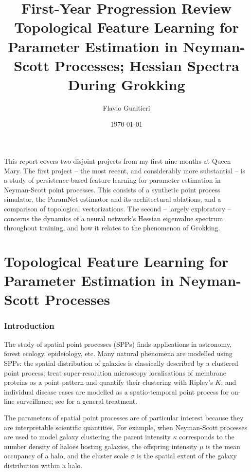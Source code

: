 \documentclass[11pt,a4paper]{article}
\title{First-Year Progression Review\\[4pt]
       \large Topological Feature Learning for Parameter Estimation in
       Neyman-Scott Processes; Hessian Spectra During Grokking}
\author{Flavio Gualtieri}
\date{\today}
\begin{document}
\maketitle

\noindent
This report covers two disjoint projects from my first nine months at Queen Mary. The first project -- the most recent, and considerably more substantial -- is a study of persistence-based feature learning for parameter estimation in Neyman-Scott point processes. This consists of a synthetic point process simulator, the ParamNet estimator and its
architectural ablations, and a comparison of topological vectorizations. The second -- largely exploratory -- concerns the dynamics of a neural network's Hessian eigenvalue spectrum throughout training, and how it relates to the phenomenon of Grokking.

\part{Topological Feature Learning for Parameter Estimation in Neyman-Scott
Processes}

\section{Introduction}
\label{sec:intro}

The study of spatial point processes (SPPs) finds applications in astronomy, forest ecology, epideiology, etc. Many natural phenomena are modelled using SPPs: the spatial distribution of galaxies is classically described by a clustered point process;
\citet{owen2010palm} treat super-resolution microscopy localisations of membrane proteins as a point pattern and quantify their clustering with Ripley's $K$; and individual disease cases are modelled as a spatio-temporal point process for on-line surveillance; see
\citet{moller2004statistical} for a general treatment.

The parameters of spatial point processes are of particular interest because they are interpretable scientific quantities. For example, when Neyman-Scott processes are used to model galaxy clustering the parent intensity $\kappa$ corresponds to the number density of haloes hosting galaxies, the offspring intensity $\mu$ is the mean occupancy of a halo, and the cluster scale $\sigma$ is the spatial extent of the galaxy distribution within a halo.
\end{document}
